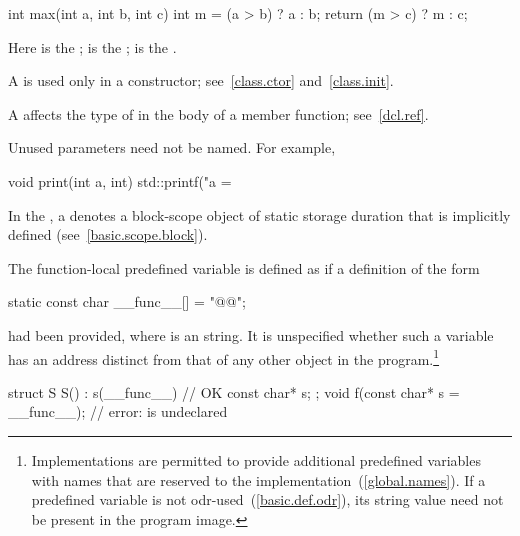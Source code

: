 %
\begin{codeblock}
int max(int a, int b, int c) {
  int m = (a > b) ? a : b;
  return (m > c) ? m : c;
}
\end{codeblock}

Here
is the
;
is the
;
is the
.
\exitexample

\pnum
{}%
%
%
A
is used only in a constructor; see~\ref{class.ctor} and~\ref{class.init}.

\pnum
\enternote
A  affects the type of 
in the body of a member function; see~\ref{dcl.ref}.
\exitnote

\pnum
\enternote
Unused parameters need not be named.
For example,

%
\begin{codeblock}
void print(int a, int) {
  std::printf("a = %
}
\end{codeblock}
\exitnote

\pnum
In the , a
 denotes a block-scope object of static
storage duration that is implicitly defined (see~\ref{basic.scope.block}).

\pnum
The function-local predefined variable  is
defined as if a definition of the form

\begin{codeblock}
static const char __func__[] = "@@";
\end{codeblock}

had been provided, where  is an  string. It is unspecified whether such a variable has an address
distinct from that of any other object in the program.\footnote{Implementations are
permitted to provide additional predefined variables with names that are reserved to the
implementation~(\ref{global.names}). If a predefined variable is not
odr-used~(\ref{basic.def.odr}), its string value need not be present in the program image.}

\enterexample
\begin{codeblock}
struct S {
  S() : s(__func__) { }             // OK
  const char* s;
};
void f(const char* s = __func__);  // error:  is undeclared
\end{codeblock}
\exitexample


